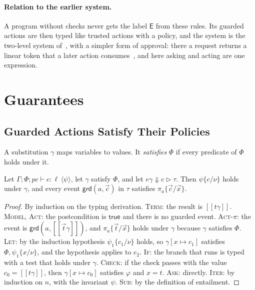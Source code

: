 \documentclass[acmsmall,nonacm,screen]{acmart}
\newcommand{\kw}[1]{\mathsf{#1}}
\newcommand{\E}{\kw{E}}
\newcommand{\ev}[3]{#1 \Downarrow #2 \triangleright #3}
\newcommand{\sem}[1]{[\![#1]\!]}
\newcommand{\ty}[4]{\Gamma; #1; #2 \vdash #3 : #4}
\newcommand{\post}[1]{\langle #1 \rangle}
\begin{document}
\paragraph{Relation to the earlier system.} A program without checks never gets the label
$\E$ from these rules. Its guarded actions are then typed like trusted actions with a policy,
and the system is the two-level system of~\cite{tpp5}, with a simpler form of approval: there
a request returns a linear token that a later action consumes~\cite{tpp4}, and here asking
and acting are one expression.

\section{Guarantees}
\label{sec:guarantees}

\subsection{Guarded Actions Satisfy Their Policies}

A substitution $\gamma$ maps variables to values. It \emph{satisfies} $\Phi$ if every
predicate of $\Phi$ holds under it.

\begin{theorem}[Policies]
\label{thm:policy}
Let $\ty{\Phi}{pc}{e}{\ell\,\post{\psi}}$, let $\gamma$ satisfy $\Phi$, and let
$\ev{e\gamma}{c}{\tau}$. Then $\psi\{c/\nu\}$ holds under $\gamma$, and every event
$\kw{grd}(a, \vec c)$ in $\tau$ satisfies $\pi_a\{\vec c/\vec x\}$.
\end{theorem}

\begin{proof}
By induction on the typing derivation. \textsc{Term}: the result is $\sem{t\gamma}$.
\textsc{Model}, \textsc{Act}: the postcondition is $\kw{true}$ and there is no guarded event.
\textsc{Act-$\pi$}: the event is $\kw{grd}(a, \sem{\vec t\gamma})$, and
$\pi_a\{\vec t/\vec x\}$ holds under $\gamma$ because $\gamma$ satisfies $\Phi$.
\textsc{Let}: by the induction hypothesis $\psi_1\{c_1/\nu\}$ holds, so
$\gamma[x \mapsto c_1]$ satisfies $\Phi, \psi_1\{x/\nu\}$, and the hypothesis applies to
$e_2$. \textsc{If}: the branch that runs is typed with a test that holds under $\gamma$.
\textsc{Check}: if the check passes with the value $c_0 = \sem{t\gamma}$, then
$\gamma[x \mapsto c_0]$ satisfies $\varphi$ and $x = t$. \textsc{Ask}: directly.
\textsc{Iter}: by induction on $n$, with the invariant $\psi$. \textsc{Sub}: by the
definition of entailment.
\end{proof}
\end{document}
